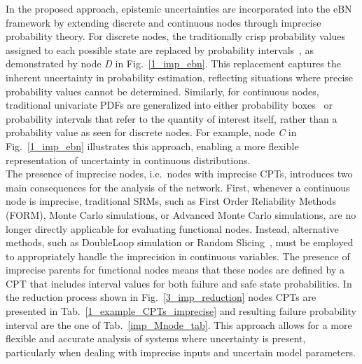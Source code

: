 In the proposed approach, epistemic uncertainties are incorporated into the eBN framework by extending discrete and continuous nodes through imprecise probability theory.
For discrete nodes, the traditionally crisp probability values assigned to each possible state are replaced by probability intervals~\cite{weichselberger_theory_2000}, as demonstrated by node \textit{D} in Fig.~\ref{1_imp_ebn}. 
This replacement captures the inherent uncertainty in probability estimation, reflecting situations where precise probability values cannot be determined. Similarly, for continuous nodes, traditional univariate PDFs are generalized into either probability boxes~\cite{ferson_2003} or probability intervals that refer to the quantity of interest itself, rather than a probability value as seen for discrete nodes. 
For example, node \textit{C} in Fig.~\ref{1_imp_ebn} illustrates this approach, enabling a more flexible representation of uncertainty in continuous distributions.\\

The presence of imprecise nodes, i.e.\ nodes with imprecise CPTs, introduces two main consequences for the analysis of the network. 
First, whenever a continuous node is imprecise, traditional SRMs, such as First Order Reliability Methods (FORM), Monte Carlo simulations, or Advanced Monte Carlo simulations, are no longer directly applicable for evaluating functional nodes. 
Instead, alternative methods, such as DoubleLoop simulation or Random Slicing~\cite{ALVAREZ_randomslicing}, must be employed to appropriately handle the imprecision in continuous variables. 
The presence of imprecise parents for functional nodes means that these nodes are defined by a CPT that includes interval values for both failure and safe state probabilities. In the reduction process shown in Fig.~\ref{3_imp_reduction} nodes CPTs are presented in Tab.~\ref{1_example_CPTs_imprecise} and resulting failure probability interval are the one of Tab.~\ref{imp_Mnode_tab}. 
This approach allows for a more flexible and accurate analysis of systems where uncertainty is present, particularly when dealing with imprecise inputs and uncertain model parameters.

